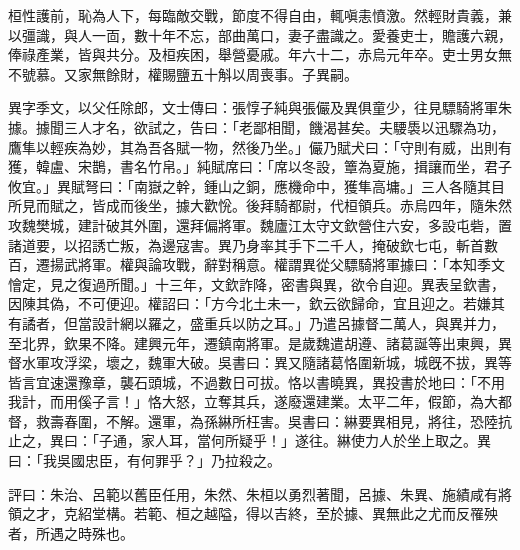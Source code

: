 \begin{pinyinscope}
桓性護前，恥為人下，每臨敵交戰，節度不得自由，輒嗔恚憤激。然輕財貴義，兼以彊識，與人一靣，數十年不忘，部曲萬口，妻子盡識之。愛養吏士，贍護六親，俸祿產業，皆與共分。及桓疾困，舉營憂戚。年六十二，赤烏元年卒。吏士男女無不號慕。又家無餘財，權賜鹽五十斛以周喪事。子異嗣。

異字季文，以父任除郎，文士傳曰：張惇子純與張儼及異俱童少，往見驃騎將軍朱據。據聞三人才名，欲試之，告曰：「老鄙相聞，饑渴甚矣。夫騕䮍以迅驟為功，鷹隼以輕疾為妙，其為吾各賦一物，然後乃坐。」儼乃賦犬曰：「守則有威，出則有獲，韓盧、宋鵲，書名竹帛。」純賦席曰：「席以冬設，簟為夏施，揖讓而坐，君子攸宜。」異賦弩曰：「南嶽之幹，鍾山之銅，應機命中，獲隼高墉。」三人各隨其目所見而賦之，皆成而後坐，據大歡恱。後拜騎都尉，代桓領兵。赤烏四年，隨朱然攻魏樊城，建計破其外圍，還拜偏將軍。魏廬江太守文欽營住六安，多設屯砦，置諸道要，以招誘亡叛，為邊寇害。異乃身率其手下二千人，掩破欽七屯，斬首數百，遷揚武將軍。權與論攻戰，辭對稱意。權謂異從父驃騎將軍據曰：「本知季文懀定，見之復過所聞。」十三年，文欽詐降，密書與異，欲令自迎。異表呈欽書，因陳其偽，不可便迎。權詔曰：「方今北土未一，欽云欲歸命，宜且迎之。若嫌其有譎者，但當設計網以羅之，盛重兵以防之耳。」乃遣呂據督二萬人，與異并力，至北界，欽果不降。建興元年，遷鎮南將軍。是歲魏遣胡遵、諸葛誕等出東興，異督水軍攻浮梁，壞之，魏軍大破。吳書曰：異又隨諸葛恪圍新城，城旣不拔，異等皆言宜速還豫章，襲石頭城，不過數日可拔。恪以書曉異，異投書於地曰：「不用我計，而用傒子言！」恪大怒，立奪其兵，遂廢還建業。太平二年，假節，為大都督，救壽春圍，不解。還軍，為孫綝所枉害。吳書曰：綝要異相見，將往，恐陸抗止之，異曰：「子通，家人耳，當何所疑乎！」遂往。綝使力人於坐上取之。異曰：「我吳國忠臣，有何罪乎？」乃拉殺之。

評曰：朱治、呂範以舊臣任用，朱然、朱桓以勇烈著聞，呂據、朱異、施績咸有將領之才，克紹堂構。若範、桓之越隘，得以吉終，至於據、異無此之尤而反罹殃者，所遇之時殊也。


\end{pinyinscope}